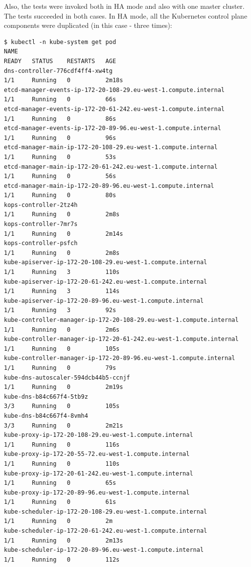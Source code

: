 Also, the tests were invoked both in HA mode and also with one master cluster. The tests succeeded in both cases. In HA mode, all the Kubernetes control plane components were duplicated (in this case - three times):
\begin{lstlisting}[basicstyle=\tiny,caption={Kubernetes control plane components, HA}]
$ kubectl -n kube-system get pod
NAME                                                                  READY   STATUS    RESTARTS   AGE
dns-controller-776cdf4ff4-xw4tg                                       1/1     Running   0          2m18s
etcd-manager-events-ip-172-20-108-29.eu-west-1.compute.internal       1/1     Running   0          66s
etcd-manager-events-ip-172-20-61-242.eu-west-1.compute.internal       1/1     Running   0          86s
etcd-manager-events-ip-172-20-89-96.eu-west-1.compute.internal        1/1     Running   0          96s
etcd-manager-main-ip-172-20-108-29.eu-west-1.compute.internal         1/1     Running   0          53s
etcd-manager-main-ip-172-20-61-242.eu-west-1.compute.internal         1/1     Running   0          56s
etcd-manager-main-ip-172-20-89-96.eu-west-1.compute.internal          1/1     Running   0          80s
kops-controller-2tz4h                                                 1/1     Running   0          2m8s
kops-controller-7mr7s                                                 1/1     Running   0          2m14s
kops-controller-psfch                                                 1/1     Running   0          2m8s
kube-apiserver-ip-172-20-108-29.eu-west-1.compute.internal            1/1     Running   3          110s
kube-apiserver-ip-172-20-61-242.eu-west-1.compute.internal            1/1     Running   3          114s
kube-apiserver-ip-172-20-89-96.eu-west-1.compute.internal             1/1     Running   3          92s
kube-controller-manager-ip-172-20-108-29.eu-west-1.compute.internal   1/1     Running   0          2m6s
kube-controller-manager-ip-172-20-61-242.eu-west-1.compute.internal   1/1     Running   0          105s
kube-controller-manager-ip-172-20-89-96.eu-west-1.compute.internal    1/1     Running   0          79s
kube-dns-autoscaler-594dcb44b5-ccnjf                                  1/1     Running   0          2m19s
kube-dns-b84c667f4-5tb9z                                              3/3     Running   0          105s
kube-dns-b84c667f4-8vmh4                                              3/3     Running   0          2m21s
kube-proxy-ip-172-20-108-29.eu-west-1.compute.internal                1/1     Running   0          116s
kube-proxy-ip-172-20-55-72.eu-west-1.compute.internal                 1/1     Running   0          110s
kube-proxy-ip-172-20-61-242.eu-west-1.compute.internal                1/1     Running   0          65s
kube-proxy-ip-172-20-89-96.eu-west-1.compute.internal                 1/1     Running   0          61s
kube-scheduler-ip-172-20-108-29.eu-west-1.compute.internal            1/1     Running   0          2m
kube-scheduler-ip-172-20-61-242.eu-west-1.compute.internal            1/1     Running   0          2m13s
kube-scheduler-ip-172-20-89-96.eu-west-1.compute.internal             1/1     Running   0          112s
\end{lstlisting}

